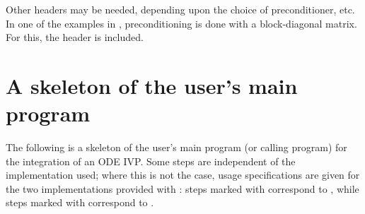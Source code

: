 Other headers may be needed, depending upon the choice of
preconditioner, etc. In one of the examples in \cite{cvodes2.3.0_ex},
preconditioning is done with a block-diagonal matrix. For this, the
header  is included.

\section{A skeleton of the user's main program}\label{ss:skeleton_sim}

The following is a skeleton of the user's main program (or calling
program) for the integration of an ODE IVP. Some steps are independent
of the {\nvector} implementation used; where this is not the case,
usage specifications are given for the two implementations provided
with {\cvodes}: steps marked with {\p} correspond to {\nvecp}, while
steps marked with {\s} correspond to {\nvecs}.
